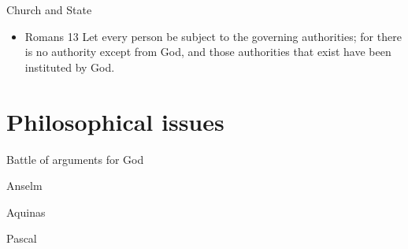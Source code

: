 \begin{frame}[label=sec-1-5]{Church and State}
\begin{itemize}
\item Romans 13 Let every person be subject to the governing authorities; for there is no authority except from God, and those authorities that exist have been instituted by God.
\end{itemize}
\end{frame}
\section{Philosophical issues}
\label{sec-2}
\begin{frame}[label=sec-2-1]{Battle of arguments for God}
\begin{block}{Anselm}
\end{block}
\begin{block}{Aquinas}
\end{block}
\begin{block}{Pascal}
\end{block}
\end{frame}
    {
    \begin{frame}[plain]
    \end{frame}
    }



